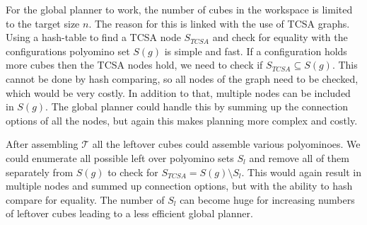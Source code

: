 For the global planner to work, the number of cubes in the workspace is limited to the target size $n$.
The reason for this is linked with the use of TCSA graphs.
Using a hash-table to find a TCSA node $S_\textit{TCSA}$ and check for equality with the configurations polyomino set $S(g)$ is simple and fast.
If a configuration holds more cubes then the TCSA nodes hold, we need to check if $S_\textit{TCSA} \subseteq S(g)$.
This cannot be done by hash comparing, so all nodes of the graph need to be checked, which would be very costly.
In addition to that, multiple nodes can be included in $S(g)$.
The global planner could handle this by summing up the connection options of all the nodes, but again this makes planning more complex and costly.

After assembling $\mathcal{T}$ all the leftover cubes could assemble various polyominoes.
We could enumerate all possible left over polyomino sets $S_l$ and remove all of them separately from $S(g)$ to check for $S_\textit{TCSA} = S(g) \setminus S_l$.
This would again result in multiple nodes and summed up connection options, but with the ability to hash compare for equality.
The number of $S_l$ can become huge for increasing numbers of leftover cubes leading to a less efficient global planner.




